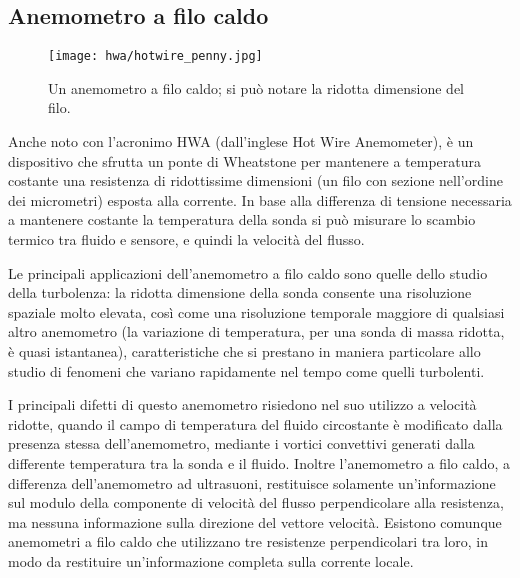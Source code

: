 \documentclass{article} %
\begin{document}
\subsection{Anemometro a filo caldo}
\begin{figure}[ht!]
	\centering
	\texttt{[image: hwa/hotwire\_penny.jpg]}
	\caption{Un anemometro a filo caldo; si può notare la ridotta dimensione del filo.}
\end{figure}
Anche noto con l'acronimo HWA (dall'inglese Hot Wire Anemometer), è un dispositivo che sfrutta un ponte di Wheatstone per mantenere a temperatura costante una resistenza di ridottissime dimensioni (un filo con sezione nell'ordine dei micrometri) esposta alla corrente. In base alla differenza di tensione necessaria a mantenere costante la temperatura della sonda si può misurare lo scambio termico tra fluido e sensore, e quindi la velocità del flusso.\par
Le principali applicazioni dell'anemometro a filo caldo sono quelle dello studio della turbolenza: la ridotta dimensione della sonda consente una risoluzione spaziale molto elevata, così come una risoluzione temporale maggiore di qualsiasi altro anemometro (la variazione di temperatura, per una sonda di massa ridotta, è quasi istantanea), caratteristiche che si prestano in maniera particolare allo studio di fenomeni che variano rapidamente nel tempo come quelli turbolenti.\par
I principali difetti di questo anemometro risiedono nel suo utilizzo a velocità ridotte, quando il campo di temperatura del fluido circostante è modificato dalla presenza stessa dell'anemometro, mediante i vortici convettivi generati dalla differente temperatura tra la sonda e il fluido. Inoltre l'anemometro a filo caldo, a differenza dell'anemometro ad ultrasuoni, restituisce solamente un'informazione sul modulo della componente di velocità del flusso perpendicolare alla resistenza, ma nessuna informazione sulla direzione del vettore velocità. Esistono comunque anemometri a filo caldo che utilizzano tre resistenze perpendicolari tra loro, in modo da restituire un'informazione completa sulla corrente locale.
\end{document}
